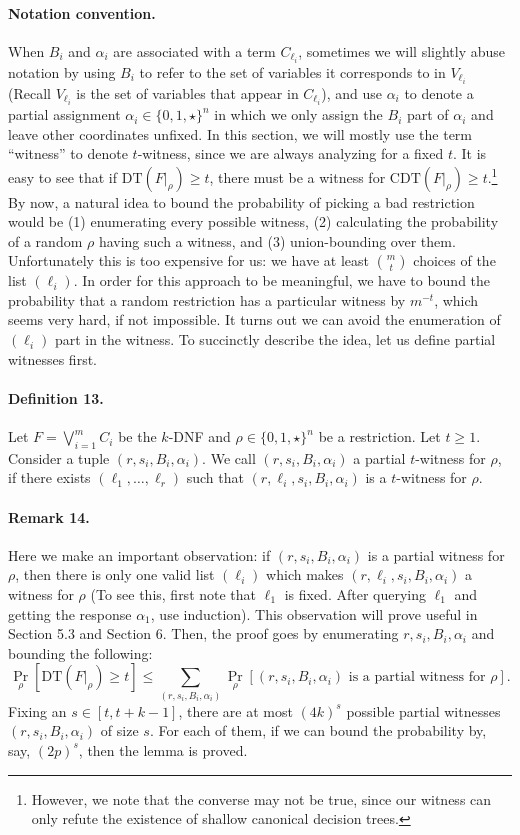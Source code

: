 \documentclass[10pt,a4paper]{article}
\begin{document}
\paragraph{Notation convention.} When $B_i$ and $\alpha_i$ are associated with a term $C_{\ell_i}$, sometimes we will slightly abuse notation by using $B_i$ to refer to the set of variables it corresponds to in $V_{\ell_i}$ (Recall $V_{\ell_i}$ is the set of variables that appear in $C_{\ell_i}$), and use $\alpha_i$ to denote a partial assignment $\alpha_i\in\{0,1,\star\}^n$ in which we only assign the $B_i$ part of $\alpha_i$ and leave other coordinates unfixed. In this section, we will mostly use the term ``witness'' to denote $t$-witness, since we are always analyzing for a fixed $t$.
It is easy to see that if $\mathrm{DT}(F|_\rho)\ge t$, there must be a witness for $\mathrm{CDT}(F|_\rho)\ge t$.\footnote{However, we note that the converse may not be true, since our witness can only refute the existence of shallow canonical decision trees.} By now, a natural idea to bound the probability of picking a bad restriction would be (1) enumerating every possible witness, (2) calculating the probability of a random $\rho$ having such a witness, and (3) union-bounding over them. Unfortunately this is too expensive for us: we have at least $\binom mt$ choices of the list $(\ell_i)$. In order for this approach to be meaningful, we have to bound the probability that a random restriction has a particular witness by $m^{-t}$, which seems very hard, if not impossible. It turns out we can avoid the enumeration of $(\ell_i)$ part in the witness. To succinctly describe the idea, let us define partial witnesses first.
\paragraph{Definition 13.} Let $F=\bigvee_{i=1}^mC_i$ be the $k$-DNF and $\rho\in\{0,1,\star\}^n$ be a restriction. Let $t\ge1$. Consider a tuple $(r,s_i,B_i,\alpha_i)$. We call $(r,s_i,B_i,\alpha_i)$ a partial $t$-witness for $\rho$, if there exists $(\ell_1,\ldots,\ell_r)$ such that $(r,\ell_i,s_i,B_i,\alpha_i)$ is a $t$-witness for $\rho$.
\paragraph{Remark 14.} Here we make an important observation: if $(r,s_i,B_i,\alpha_i)$ is a partial witness for $\rho$, then there is only one valid list $(\ell_i)$ which makes $(r,\ell_i,s_i,B_i,\alpha_i)$ a witness for $\rho$ (To see this, first note that $\ell_1$ is fixed. After querying $\ell_1$ and getting the response $\alpha_1$, use induction). This observation will prove useful in Section 5.3 and Section 6.
Then, the proof goes by enumerating $r,s_i,B_i,\alpha_i$ and bounding the following:
\[\Pr_\rho[\mathrm{DT}(F|_\rho)\ge t]\le\sum_{(r,s_i,B_i,\alpha_i)}\Pr_\rho[(r,s_i,B_i,\alpha_i)\text{ is a partial witness for }\rho].\tag{5}\]
Fixing an $s\in[t,t+k-1]$, there are at most $(4k)^s$ possible partial witnesses $(r,s_i,B_i,\alpha_i)$ of size $s$. For each of them, if we can bound the probability by, say, $(2p)^s$, then the lemma is proved.
\end{document}
